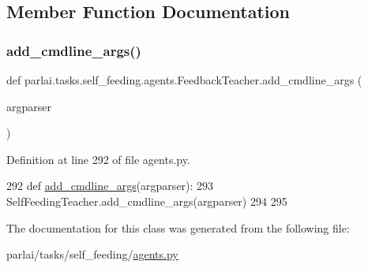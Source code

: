 \subsection{Member Function Documentation}
\mbox{\label{classparlai_1_1tasks_1_1self__feeding_1_1agents_1_1FeedbackTeacher_ad574b840424ec2d7096639c198af08c7}} 
\subsubsection{\texorpdfstring{add\+\_\+cmdline\+\_\+args()}{add\_cmdline\_args()}}
{\footnotesize\ttfamily def parlai.\+tasks.\+self\+\_\+feeding.\+agents.\+Feedback\+Teacher.\+add\+\_\+cmdline\+\_\+args (\begin{DoxyParamCaption}\item[{}]{argparser }\end{DoxyParamCaption})\hspace{0.3cm}{\ttfamily [static]}}



Definition at line 292 of file agents.\+py.


\begin{DoxyCode}
292     \textcolor{keyword}{def }\hyperlink{namespaceparlai_1_1agents_1_1drqa_1_1config_a62fdd5554f1da6be0cba185271058320}{add\_cmdline\_args}(argparser):
293         SelfFeedingTeacher.add\_cmdline\_args(argparser)
294 
295 
\end{DoxyCode}


The documentation for this class was generated from the following file\+:\begin{DoxyCompactItemize}
\item 
parlai/tasks/self\+\_\+feeding/\hyperlink{parlai_2tasks_2self__feeding_2agents_8py}{agents.\+py}\end{DoxyCompactItemize}
